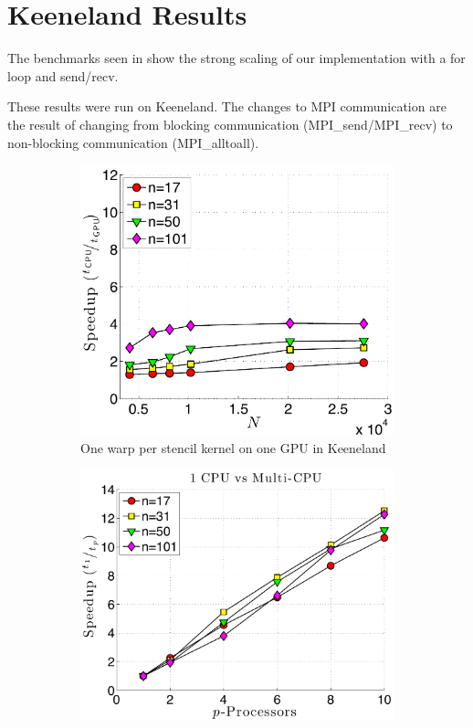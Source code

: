 
\chapter{Keeneland Results}

The benchmarks seen in \cite{BolligFlyerErlebacher2012} show the strong scaling of our implementation with a for loop and send/recv. 

These results were run on Keeneland. The changes to MPI communication are the result of changing from blocking communication (MPI\_send/MPI\_recv) to non-blocking communication (MPI\_alltoall).

\begin{figure}[htbp]
\centering
\begin{subfigure}[b]{0.425\textwidth}
\includegraphics[width=1.0\textwidth]{../figures/chapter5/alltoallv/speedup_1proc_oneWarpPerStencil.pdf}
\caption{One warp per stencil kernel on one GPU in Keeneland}
\label{fig:alltoall_1proc_warp}
\end{subfigure} 
\begin{subfigure}[b]{0.425\textwidth}
\centering
\includegraphics[width=1.0\textwidth]{../figures/chapter5/alltoallv/speedup_1CPU_vs_NCPU.pdf}

\end{subfigure}
\end{figure}
